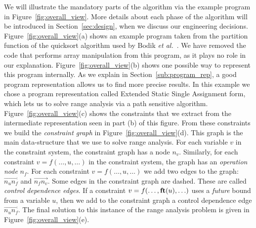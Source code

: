 \documentclass{paper}
\newcommand{\fun}[1]{\mbox{\textbf{#1}}}
\begin{document}
We will illustrate the mandatory parts of the
algorithm via the example program in Figure~\ref{fig:overall_view}.
More details about each phase of the algorithm will be introduced in
Section~\ref{sec:design}, when we discuss our engineering decisions.
Figure~\ref{fig:overall_view}(a) shows an example program taken from the
partition function of the quicksort algorithm used by Bodik
{\em et al.}~\cite{Bodik00}.
We have removed the code that performs array manipulation from this program,
as it plays no role in our explanation.
Figure~\ref{fig:overall_view}(b) shows one possible way to represent this
program internally.
As we explain in Section~\ref{sub:program_rep}, a good program
representation allows us to find more precise results.
In this example we chose a program representation called
Extended Static Single Assignment form, which lets us to solve range
analysis via a path sensitive algorithm.
Figure~\ref{fig:overall_view}(c) shows the constraints that we extract from
the intermediate representation seen in part (b) of this figure.
From these constraints we build the {\em constraint graph} in
Figure~\ref{fig:overall_view}(d).
This graph is the main data-structure that we use to solve range analysis.
For each variable $v$ in the constraint system, the constraint graph has a node
$n_v$.
Similarly, for each constraint $v = f(\ldots, u, \ldots)$ in the constraint
system, the graph has an {\em operation node} $n_f$.
For each constraint $v = f(\ldots, u, \ldots)$ we add two edges to the
graph: $\overrightarrow{n_un_f}$ and $\overrightarrow{n_fn_v}$.
Some edges in the constraint graph are dashed.
These are called {\em control dependence edges}.
If a constraint $v = f(\ldots, \fun{ft}(u), \ldots)$ uses a {\em future}
bound from a variable $u$, then we add to the constraint graph a control
dependence edge $\overrightarrow{n_un_f}$.
The final solution to this instance of the range analysis problem is
given in Figure~\ref{fig:overall_view}(e).
\end{document}
